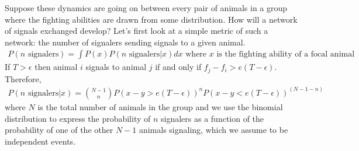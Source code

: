 \documentclass{article}
\begin{document}
%
%


Suppose these dynamics are going on between every pair of animals in a group where the fighting abilities are drawn from some distribution.  How will a network of signals exchanged develop?  Let's first look at a simple metric of such a network: the number of signalers sending signals to a given animal.  
\begin{align*}
P(n \text{ signalers})=\int P(x)P(n \text{ signalers}|x)dx \text{ where $x$ is the fighting ability of a focal animal}
\end{align*}
If $T>\epsilon$ then animal $i$ signals to animal $j$ if and only if $f_j-f_i>e(T-\epsilon)$.  Therefore,
\begin{align*}
P(n \text{ signalers}|x)={N-1 \choose n}P(x-y>e(T-\epsilon))^nP(x-y<e(T-\epsilon))^{(N-1-n)}
\end{align*}
where $N$ is the total number of animals in the group and we use the binomial distribution to express the probability of $n$ signalers as a function of the probability of one of the other $N-1$ animals signaling, which we assume to be independent events.
\end{document}
